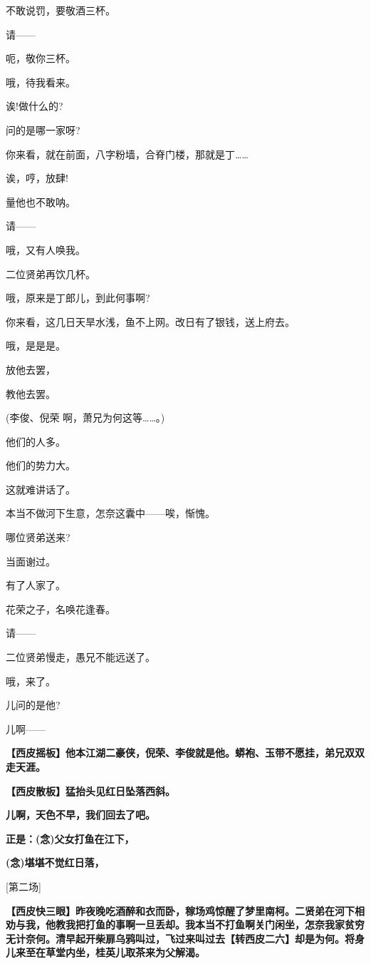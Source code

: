 不敢说罚，要敬酒三杯。

请------

呃，敬你三杯。

哦，待我看来。

诶!做什么的?

问的是哪一家呀?

你来看，就在前面，八字粉墙，合脊门楼，那就是丁\ldots{}\ldots{}

诶，哼，放肆!

量他也不敢呐。

请------

哦，又有人唤我。

二位贤弟再饮几杯。

哦，原来是丁郎儿，到此何事啊?

你来看，这几日天旱水浅，鱼不上网。改日有了银钱，送上府去。

哦，是是是。

放他去罢，

教他去罢。

(李俊、倪荣 啊，萧兄为何这等\ldots{}\ldots{}。)

他们的人多。

他们的势力大。

这就难讲话了。

本当不做河下生意，怎奈这囊中------唉，惭愧。

哪位贤弟送来?

当面谢过。

有了人家了。

花荣之子，名唤花逢春。

请------

二位贤弟慢走，愚兄不能远送了。

哦，来了。

儿问的是他?

儿啊------

\textbf{【西皮摇板】他本江湖二豪侠，倪荣、李俊就是他。蟒袍、玉带不愿挂，弟兄双双走天涯。}

\textbf{【西皮散板】猛抬头见红日坠落西斜。}

\textbf{儿啊，天色不早，我们回去了吧。}

\textbf{正是：(念)父女打鱼在江下，}

\textbf{(念)堪堪不觉红日落，}

{[}第二场{]}

\textbf{【西皮快三眼】昨夜晚吃酒醉和衣而卧，稼场鸡惊醒了梦里南柯。二贤弟在河下相劝与我，他教我把打鱼的事啊一旦丢却。我本当不打鱼啊关门闲坐，怎奈我家贫穷无计奈何。清早起开柴扉乌鸦叫过，飞过来叫过去【转西皮二六】却是为何。将身儿来至在草堂内坐，桂英儿取茶来为父解渴。}

